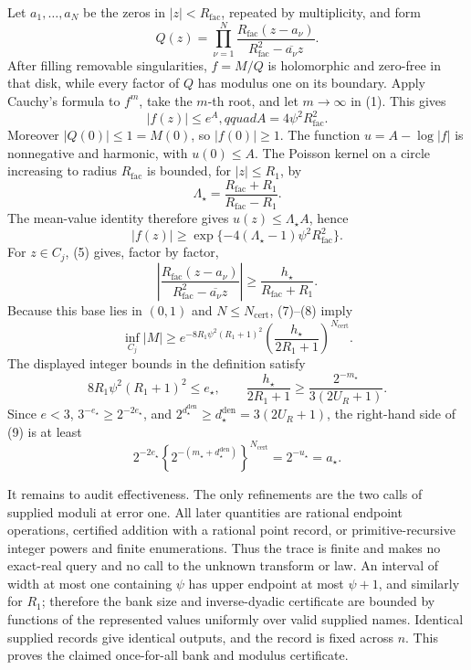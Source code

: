 Let \(a_1,\ldots,a_N\) be the zeros in \(|z|<R_{\mathrm{fac}}\), repeated by multiplicity, and form
\[
 Q(z)=\prod_{\nu=1}^N
 \frac{R_{\mathrm{fac}}(z-a_\nu)}
      {R_{\mathrm{fac}}^2-\overline{a_\nu}z}.
\]
After filling removable singularities, \(f=M/Q\) is holomorphic and zero-free in that disk, while every factor of \(Q\) has modulus one on its boundary.  Apply Cauchy's formula to \(f^m\), take the \(m\)-th root, and let \(m\to\infty\) in (1).  This gives
\[
 |f(z)|\le e^A,qquad A=4\psi^2R_{\mathrm{fac}}^2. \tag{6}
\]
Moreover \(|Q(0)|\le1=M(0)\), so \(|f(0)|\ge1\).  The function \(u=A-\log|f|\) is nonnegative and harmonic, with \(u(0)\le A\).  The Poisson kernel on a circle increasing to radius \(R_{\mathrm{fac}}\) is bounded, for \(|z|\le R_1\), by
\[
 \Lambda_{\star}
 =\frac{R_{\mathrm{fac}}+R_1}{R_{\mathrm{fac}}-R_1}.
\]
The mean-value identity therefore gives \(u(z)\le\Lambda_{\star}A\), hence
\[
 |f(z)|\ge
 \exp\{-4(\Lambda_{\star}-1)\psi^2R_{\mathrm{fac}}^2\}. \tag{7}
\]
For \(z\in C_j\), (5) gives, factor by factor,
\[
 \left|
 \frac{R_{\mathrm{fac}}(z-a_\nu)}
      {R_{\mathrm{fac}}^2-\overline{a_\nu}z}
 \right|
 \ge\frac{h_{\star}}{R_{\mathrm{fac}}+R_1}. \tag{8}
\]
Because this base lies in \((0,1)\) and \(N\le N_{\mathrm{cert}}\), (7)--(8) imply
\[
 \inf_{C_j}|M|
 \ge e^{-8R_1\psi^2(R_1+1)^2}
 \left(\frac{h_{\star}}{2R_1+1}\right)^{N_{\mathrm{cert}}}. \tag{9}
\]
The displayed integer bounds in the definition satisfy
\[
 8R_1\psi^2(R_1+1)^2\le e_{\star},
 \qquad
 \frac{h_{\star}}{2R_1+1}
 \ge\frac{2^{-m_{\star}}}{3(2U_R+1)}.
\]
Since \(e<3\), \(3^{-e_{\star}}\ge2^{-2e_{\star}}\), and \(2^{d_{\star}^{\mathrm{den}}}\ge d_{\star}^{\mathrm{den}}=3(2U_R+1)\), the right-hand side of (9) is at least
\[
 2^{-2e_{\star}}
 \left\{2^{-(m_{\star}+d_{\star}^{\mathrm{den}})}\right\}^{N_{\mathrm{cert}}}
 =2^{-u_{\star}}=a_{\star}. \tag{10}
\]

It remains to audit effectiveness.  The only refinements are the two calls of supplied moduli at error one.  All later quantities are rational endpoint operations, certified addition with a rational point record, or primitive-recursive integer powers and finite enumerations.  Thus the trace is finite and makes no exact-real query and no call to the unknown transform or law.  An interval of width at most one containing \(\psi\) has upper endpoint at most \(\psi+1\), and similarly for \(R_1\); therefore the bank size and inverse-dyadic certificate are bounded by functions of the represented values uniformly over valid supplied names.  Identical supplied records give identical outputs, and the record is fixed across \(n\).  This proves the claimed once-for-all bank and modulus certificate.